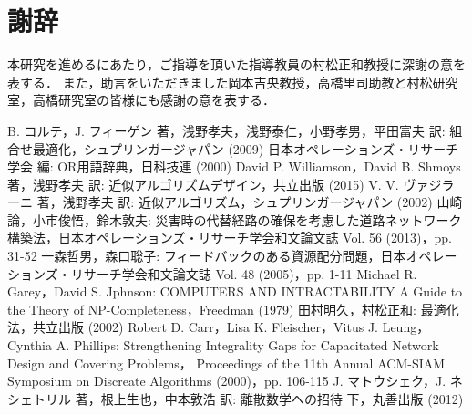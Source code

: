 \documentclass[11pt,dvipdfmx]{jarticle}
\numberwithin{equation}{section}
\begin{document}
\section{謝辞}
    本研究を進めるにあたり，ご指導を頂いた指導教員の村松正和教授に深謝の意を表する．
    また，助言をいただきました岡本吉央教授，高橋里司助教と村松研究室，高橋研究室の皆様にも感謝の意を表する．

\begin{thebibliography}{99}
        B. コルテ，J. フィーゲン 著，浅野孝夫，浅野泰仁，小野孝男，平田富夫 訳: 組合せ最適化，シュプリンガージャパン (2009)
        日本オペレーションズ・リサーチ学会 編: OR用語辞典，日科技連 (2000)
        David P. Williamson，David B. Shmoys 著，浅野孝夫 訳: 近似アルゴリズムデザイン，共立出版 (2015)
        V. V. ヴァジラーニ 著，浅野孝夫 訳: 近似アルゴリズム，シュプリンガージャパン (2002)
        山崎論，小市俊悟，鈴木敦夫: 災害時の代替経路の確保を考慮した道路ネットワーク構築法，日本オペレーションズ・リサーチ学会和文論文誌 Vol. 56 (2013)，pp. 31-52
       一森哲男，森口聡子: フィードバックのある資源配分問題，日本オペレーションズ・リサーチ学会和文論文誌 Vol. 48 (2005)，pp. 1-11
        Michael R. Garey，David S. Jphnson: COMPUTERS AND INTRACTABILITY A Guide to the Theory of NP-Completeness，Freedman (1979)
        田村明久，村松正和: 最適化法，共立出版 (2002)
        Robert D. Carr，Lisa K. Fleischer，Vitus J. Leung，Cynthia A. Phillips: Strengthening Integrality Gaps for Capacitated Network Design and Covering Problems，
        Proceedings of the 11th Annual ACM-SIAM Symposium on Discreate Algorithms (2000)，pp. 106-115
        J. マトウシェク，J. ネシェトリル 著，根上生也，中本敦浩 訳: 離散数学への招待 下，丸善出版 (2012)
\end{thebibliography}
\newpage
\appendix
\def\thesection{付録\Alph{section}}
\def\thesubsection{\thesection--\alph{subsection}}
\makeatletter
\renewcommand{\thealgorithm}{\arabic{algorithm}}
\makeatother
\setcounter{algorithm}{0}
\end{document}
